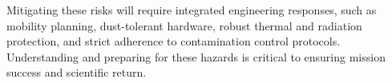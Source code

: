 Mitigating these risks will require integrated engineering responses, such as mobility planning, dust-tolerant hardware, robust thermal and radiation protection, and strict adherence to contamination control protocols. Understanding and preparing for these hazards is critical to ensuring mission success and scientific return.